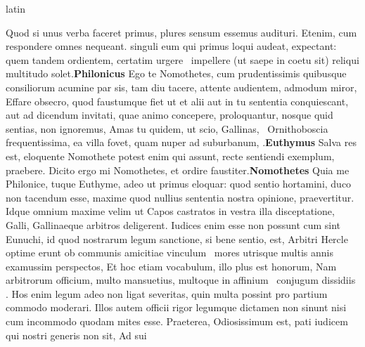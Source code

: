 \documentclass[12pt]{book}
\renewenvironment{latin}
    	{\begin{hyphenrules}{latin}}
    	{\end{hyphenrules}}
\begin{document}
\begin{pages}
\begin{latin}
\begin{Leftside}
                    Quod si unus verba faceret primus, plures sensum essemus audituri. 
                    Etenim, cum respondere omnes nequeant. singuli eum qui primus loqui audeat, expectant: 
                    quem tandem ordientem, certatim urgere ﻿\ampersand\ impellere (ut saepe in coetu sit) reliqui multitudo solet.\pend\pstart\textbf{Philonicus }\hspace{1cm} Ego te Nomothetes, cum prudentissimis quibusque consiliorum acumine par sis, tam 
            diu tacere, attente audientem, admodum miror, Effare obsecro, 
            quod  faustumque fiet ut et alii aut in tu sententia conquiescant, aut
            ad dicendum invitati, quae animo concepere, proloquantur, nosque   
            quid sentias, non ignoremus, Amas tu quidem, ut scio, Gallinas, ﻿\ampersand\ Ornithoboscia frequentissima, ea villa fovet, quam nuper ad 
            suburbanum, .\pend\pstart\textbf{Euthymus }\hspace{1cm} Salva res est, eloquente Nomothete potest enim  qui assunt, recte sentiendi exemplum, praebere. 
                    Dicito ergo mi Nomothetes, et ordire faustiter.\pend\pstart\textbf{Nomothetes }\hspace{1cm} Quia me Philonice, tuque Euthyme, adeo ut primus eloquar: 
                    quod sentio hortamini, duco non tacendum esse, maxime quod nullius
                    sententia nostra opinione, praevertitur. Idque omnium maxime velim ut 
                    Capos castratos in vestra illa disceptatione, Galli, Gallinaeque arbitros deligerent. 
                    Iudices enim esse non possunt cum sint Eunuchi, 
                    id quod nostrarum legum sanctione, si bene sentio,  est, 
                    Arbitri Hercle optime erunt ob communis amicitiae vinculum ﻿\ampersand\ mores utrisque multis annis examussim perspectos, 
                    Et hoc etiam vocabulum, illo plus est honorum, 
                    Nam arbitrorum officium, multo mansuetius, multoque in affinium ﻿\ampersand\ conjugum dissidiis . 
                    Hos enim legum adeo non ligat severitas, quin multa possint pro partium commodo  moderari. 
                    Illos autem officii rigor legumque dictamen non sinunt nisi cum incommodo quodam mites esse. 
                    Praeterea, Odiosissimum est, pati iudicem qui nostri generis non sit, Ad sui 

\end{Leftside}
\end{latin}
\end{pages}
\end{document}
